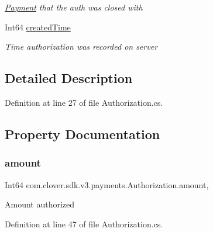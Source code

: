 \begin{DoxyCompactItemize}
\begin{DoxyCompactList}\small\item\em \hyperlink{classcom_1_1clover_1_1sdk_1_1v3_1_1payments_1_1_payment}{Payment} that the auth was closed with \end{DoxyCompactList}\item 
Int64 \hyperlink{classcom_1_1clover_1_1sdk_1_1v3_1_1payments_1_1_authorization_ae7018782eab431efa774d643076c42af}{created\+Time}
\begin{DoxyCompactList}\small\item\em Time authorization was recorded on server \end{DoxyCompactList}\end{DoxyCompactItemize}


\subsection{Detailed Description}


Definition at line 27 of file Authorization.\+cs.



\subsection{Property Documentation}
\mbox{\label{classcom_1_1clover_1_1sdk_1_1v3_1_1payments_1_1_authorization_a8be0fef9d9c4b854cbc8545086227bf5}} 
\subsubsection{\texorpdfstring{amount}{amount}}
{\footnotesize\ttfamily Int64 com.\+clover.\+sdk.\+v3.\+payments.\+Authorization.\+amount\hspace{0.3cm}{\ttfamily [get]}, {\ttfamily [set]}}



Amount authorized 



Definition at line 47 of file Authorization.\+cs.

